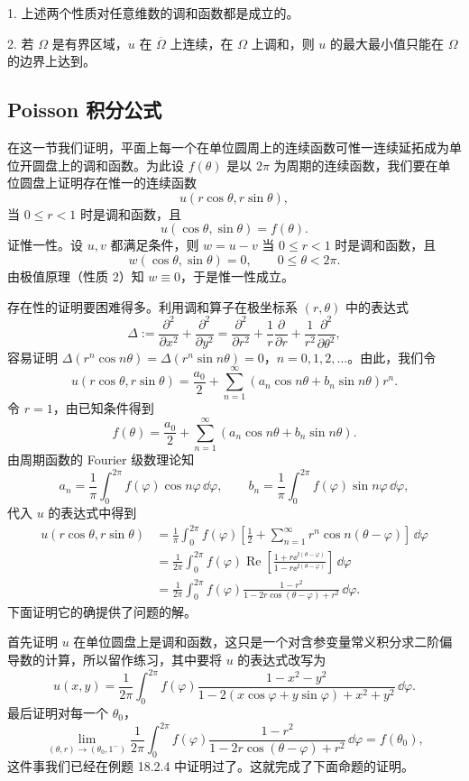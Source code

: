 \begin{xremark}
1. 上述两个性质对任意维数的调和函数都是成立的。

2. 若 $\Omega$ 是有界区域，$u$ 在 $\overline\Omega$ 上连续，在 $\Omega$ 上调和，则 $u$ 的最大最小值只能在 $\Omega$ 的边界上达到。
\end{xremark}

\subsection{Poisson 积分公式}

在这一节我们证明，平面上每一个在单位圆周上的连续函数可惟一连续延拓成为单位开圆盘上的调和函数。为此设 $f(\theta)$ 是以 $2\pi$ 为周期的连续函数，我们要在单位圆盘上证明存在惟一的连续函数
\[
  u(r\cos\theta,r\sin\theta),
\]
当 $0\le r<1$ 时是调和函数，且
\[
  u(\cos\theta,\sin\theta)=f(\theta).
\]
证惟一性。设 $u,v$ 都满足条件，则 $w=u-v$ 当 $0\le r<1$ 时是调和函数，且
\[
  w(\cos\theta,\sin\theta)=0,\qquad 0\le\theta<2\pi.
\]
由极值原理（性质 2）知 $w\equiv0$，于是惟一性成立。

存在性的证明要困难得多。利用调和算子在极坐标系 $(r,\theta)$ 中的表达式
\[
  \Delta:=\frac{\partial^2}{\partial x^2}+\frac{\partial^2}{\partial y^2}
  =\frac{\partial^2}{\partial r^2}+\frac{1}{r}\frac{\partial}{\partial r}
  +\frac{1}{r^2}\frac{\partial^2}{\partial\theta^2},
\]
容易证明 $\Delta(r^n\cos n\theta)=\Delta(r^n\sin n\theta)=0$，$n=0,1,2,\ldots$。由此，我们令
\[
  u(r\cos\theta,r\sin\theta)
  =\frac{a_0}{2}+\sum_{n=1}^\infty(a_n\cos n\theta+b_n\sin n\theta)r^n.
\]
令 $r=1$，由已知条件得到
\[
  f(\theta)=\frac{a_0}{2}+\sum_{n=1}^\infty(a_n\cos n\theta+b_n\sin n\theta).
\]
由周期函数的 Fourier 级数理论知
\[
  a_n=\frac{1}{\pi}\int_0^{2\pi}f(\varphi)\cos n\varphi\,\dd\varphi,
  \qquad
  b_n=\frac{1}{\pi}\int_0^{2\pi}f(\varphi)\sin n\varphi\,\dd\varphi,
\]
代入 $u$ 的表达式中得到
\begin{align*}
  u(r\cos\theta,r\sin\theta)
  &=\frac{1}{\pi}\int_0^{2\pi}f(\varphi)
  \left[\frac12+\sum_{n=1}^\infty r^n\cos n(\theta-\varphi)\right]\,\dd\varphi\\
  &=\frac{1}{2\pi}\int_0^{2\pi}f(\varphi)\operatorname{Re}
  \left[\frac{1+r\ee^{\ii(\theta-\varphi)}}{1-r\ee^{\ii(\theta-\varphi)}}\right]\,\dd\varphi\\
  &=\frac{1}{2\pi}\int_0^{2\pi}f(\varphi)
  \frac{1-r^2}{1-2r\cos(\theta-\varphi)+r^2}\,\dd\varphi.
\end{align*}
下面证明它的确提供了问题的解。

首先证明 $u$ 在单位圆盘上是调和函数，这只是一个对含参变量常义积分求二阶偏导数的计算，所以留作练习，其中要将 $u$ 的表达式改写为
\[
  u(x,y)=\frac{1}{2\pi}\int_0^{2\pi}f(\varphi)
  \frac{1-x^2-y^2}{1-2(x\cos\varphi+y\sin\varphi)+x^2+y^2}\,\dd\varphi.
\]
最后证明对每一个 $\theta_0$，
\[
  \lim_{(\theta,r)\to(\theta_0,1^-)}\frac{1}{2\pi}\int_0^{2\pi}f(\varphi)
  \frac{1-r^2}{1-2r\cos(\theta-\varphi)+r^2}\,\dd\varphi=f(\theta_0),
\]
这件事我们已经在例题 18.2.4 中证明过了。这就完成了下面命题的证明。

